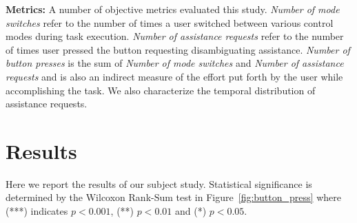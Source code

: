 \noindent\textbf{Metrics:}
A number of objective metrics evaluated this study.  \textit{Number of mode switches} refer to the number of times a user switched between various control modes during task execution. \textit{Number of assistance requests} refer to the number of times user pressed the button requesting disambiguating assistance. \textit{Number of button presses} is the sum of \textit{Number of mode switches} and \textit{Number of assistance requests} and is also an indirect measure of the effort put forth by the user while accomplishing the task. We also characterize the temporal distribution of assistance requests.

%


\section{Results}\label{sec:results}


Here we report the results of our subject study.  Statistical significance is determined by the Wilcoxon Rank-Sum test in Figure~\ref{fig:button_press} where (***) indicates $p < 0.001$, (**) $p < 0.01$ and (*) $p < 0.05$. 

